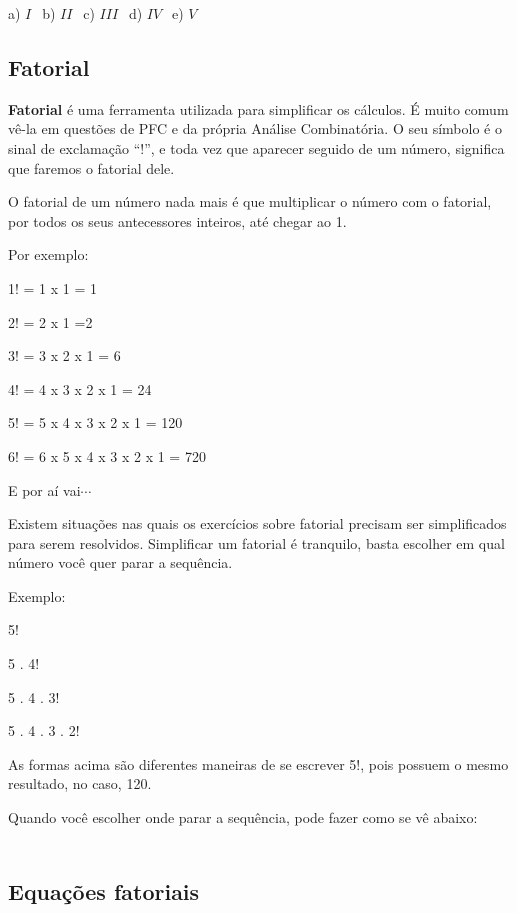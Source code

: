 \begin{multicols*}{2}
\begin{enumerate}
		a) $ I \ \ $ b) $II \ \ $ c) $III \ \ $ d) $IV \ \ $ e) $V \ \ $
		
		\end{enumerate}

		\subsection{Fatorial}
		
\textbf{Fatorial} é uma ferramenta utilizada para simplificar os cálculos. É muito comum vê-la em questões de PFC e da própria Análise Combinatória. O seu símbolo é o sinal de exclamação “!”, e toda vez que aparecer seguido de um número, significa que faremos o fatorial dele. 

O fatorial de um número nada mais é que multiplicar o número com o fatorial, por todos os seus antecessores inteiros, até chegar ao 1.

Por exemplo: 

1! = 1 x 1 = 1

2! = 2 x 1 =2

3! = 3 x 2 x 1 = 6

4! = 4 x 3 x 2 x 1 = 24

5! = 5 x 4 x 3 x 2 x 1 = 120

6! = 6 x 5 x 4 x 3 x 2 x 1 = 720

E por aí vai$\cdots$

Existem situações nas quais os exercícios sobre fatorial precisam ser simplificados para serem resolvidos. Simplificar um fatorial é tranquilo, basta escolher em qual número você quer parar a sequência.

Exemplo:

5!

5 . 4!

5 . 4 . 3!

5 . 4 . 3 . 2!

As formas acima são diferentes maneiras de se escrever 5!, pois possuem o mesmo resultado, no caso, 120.

Quando você escolher onde parar a sequência, pode fazer como se vê abaixo:\\

 \\


\subsection{Equações fatoriais}


\end{multicols*}
